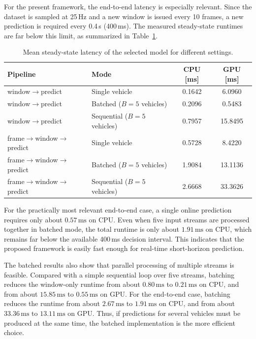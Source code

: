 \par For the present framework, the end-to-end latency is especially relevant. 
Since the dataset is sampled at 25\,Hz and a new window is issued every 10 frames, a new prediction is required every 0.4\,s (400\,ms). 
The measured steady-state runtimes are far below this limit, as summarized in Table~\ref{tab:latency_benchmark}.
\begin{table}[htbp]
\centering
\caption{Mean steady-state latency of the selected model for different settings.}
\label{tab:latency_benchmark}
\begin{tabular}{llcc}
\toprule
Pipeline & Mode & CPU [ms] & GPU [ms] \\
\midrule
window$\rightarrow$predict & Single vehicle & 0.1642 & 6.0960 \\
window$\rightarrow$predict & Batched ($B=5$ vehicles) & 0.2096 & 0.5483 \\
window$\rightarrow$predict & Sequential ($B=5$ vehicles) & 0.7957 & 15.8495 \\
frame$\rightarrow$window$\rightarrow$predict & Single vehicle & 0.5728 & 8.4220 \\
frame$\rightarrow$window$\rightarrow$predict & Batched ($B=5$ vehicles) & 1.9084 & 13.1136 \\
frame$\rightarrow$window$\rightarrow$predict & Sequential ($B=5$ vehicles) & 2.6668 & 33.3626 \\
\bottomrule
\end{tabular}
\end{table}


\par For the practically most relevant end-to-end case, a single online prediction requires only about $0.57\,\mathrm{ms}$ on CPU. 
Even when five input streams are processed together in batched mode, the total runtime is only about $1.91\,\mathrm{ms}$ on CPU, 
which remains far below the available 400\,ms decision interval. 
This indicates that the proposed framework is easily fast enough for real-time short-horizon prediction.

\par The batched results also show that parallel processing of multiple streams is feasible. 
Compared with a simple sequential loop over five streams, batching reduces the window-only runtime from about $0.80\,\mathrm{ms}$ to $0.21\,\mathrm{ms}$ on CPU, and from about $15.85\,\mathrm{ms}$ to $0.55\,\mathrm{ms}$ on GPU. 
For the end-to-end case, batching reduces the runtime from about $2.67\,\mathrm{ms}$ to $1.91\,\mathrm{ms}$ on CPU, and from about $33.36\,\mathrm{ms}$ to $13.11\,\mathrm{ms}$ on GPU. 
Thus, if predictions for several vehicles must be produced at the same time, the batched implementation is the more efficient choice.

